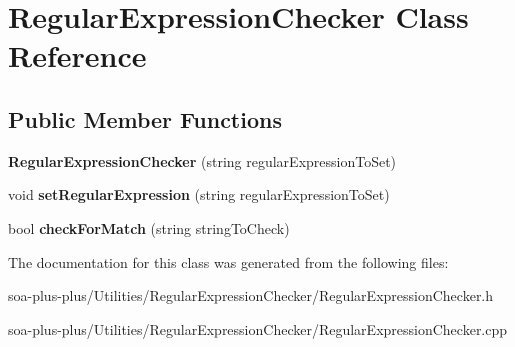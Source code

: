 \hypertarget{class_regular_expression_checker}{
\section{RegularExpressionChecker Class Reference}
\label{class_regular_expression_checker}
}
\subsection*{Public Member Functions}
\begin{DoxyCompactItemize}
\item 
\hypertarget{class_regular_expression_checker_a516fe1fc5678200295d969608850df1b}{
{\bfseries RegularExpressionChecker} (string regularExpressionToSet)}
\label{class_regular_expression_checker_a516fe1fc5678200295d969608850df1b}

\item 
\hypertarget{class_regular_expression_checker_a5d2bb0272900da08db4d3cc529fd09d8}{
void {\bfseries setRegularExpression} (string regularExpressionToSet)}
\label{class_regular_expression_checker_a5d2bb0272900da08db4d3cc529fd09d8}

\item 
\hypertarget{class_regular_expression_checker_ad3486224650616fa0cb1d4ad9143651f}{
bool {\bfseries checkForMatch} (string stringToCheck)}
\label{class_regular_expression_checker_ad3486224650616fa0cb1d4ad9143651f}

\end{DoxyCompactItemize}


The documentation for this class was generated from the following files:\begin{DoxyCompactItemize}
\item 
soa-\/plus-\/plus/Utilities/RegularExpressionChecker/RegularExpressionChecker.h\item 
soa-\/plus-\/plus/Utilities/RegularExpressionChecker/RegularExpressionChecker.cpp\end{DoxyCompactItemize}
